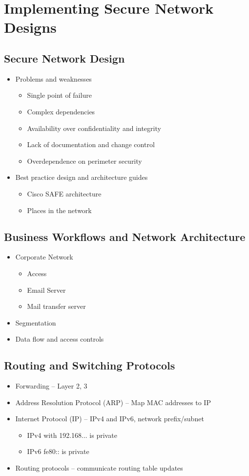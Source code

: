\section {Implementing Secure Network Designs}
	\subsection {Secure Network Design}
		\begin{itemize}
			\item Problems and weaknesses
				\begin{itemize}
					\item Single point of failure
					\item Complex dependencies
					\item Availability over confidentiality and integrity
					\item Lack of documentation and change control
					\item Overdependence on perimeter security
				\end{itemize}
			\item Best practice design and architecture guides
				\begin{itemize}
					\item Cisco SAFE architecture
					\item Places in the network
				\end{itemize}
		\end{itemize}
	\subsection {Business Workflows and Network Architecture}
		\begin{itemize}
			\item Corporate Network
				\begin{itemize}
					\item Access
					\item Email Server
					\item Mail transfer server
				\end{itemize}
			\item Segmentation
			\item Data flow and access controls
		\end{itemize}
	\subsection {Routing and Switching Protocols}
		\begin{itemize}
			\item Forwarding -- Layer 2, 3
			\item Address Resolution Protocol (ARP) -- Map MAC addresses to IP
			\item Internet Protocol (IP) -- IPv4 and IPv6, network prefix/subnet
				\begin{itemize}
					\item IPv4 with 192.168... is private
					\item IPv6 fe80:: is private
				\end{itemize}
			\item Routing protocols -- communicate routing table updates
		\end{itemize}
